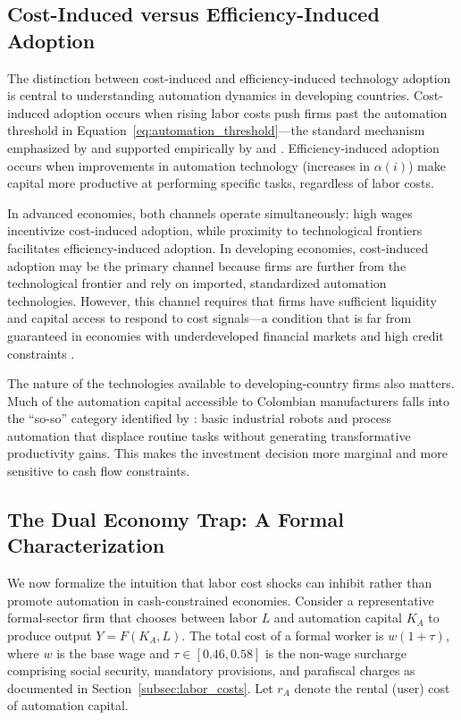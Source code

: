 \documentclass[5p,times,authoryear]{elsarticle}
\begin{document}
\subsection{Cost-Induced versus Efficiency-Induced Adoption}
\label{subsec:cost_vs_efficiency}

The distinction between cost-induced and efficiency-induced technology adoption is central to understanding automation dynamics in developing countries. Cost-induced adoption occurs when rising labor costs push firms past the automation threshold in Equation~\ref{eq:automation_threshold}---the standard mechanism emphasized by \citet{acemoglu2019automation} and supported empirically by \citet{koch2021} and \citet{adachi2022}. Efficiency-induced adoption occurs when improvements in automation technology (increases in $\alpha(i)$) make capital more productive at performing specific tasks, regardless of labor costs.

In advanced economies, both channels operate simultaneously: high wages incentivize cost-induced adoption, while proximity to technological frontiers facilitates efficiency-induced adoption. In developing economies, cost-induced adoption may be the primary channel because firms are further from the technological frontier and rely on imported, standardized automation technologies. However, this channel requires that firms have sufficient liquidity and capital access to respond to cost signals---a condition that is far from guaranteed in economies with underdeveloped financial markets and high credit constraints \citep{busso2020}.

The nature of the technologies available to developing-country firms also matters. Much of the automation capital accessible to Colombian manufacturers falls into the ``so-so'' category identified by \citet{acemoglu2020taxes}: basic industrial robots and process automation that displace routine tasks without generating transformative productivity gains. This makes the investment decision more marginal and more sensitive to cash flow constraints.

\subsection{The Dual Economy Trap: A Formal Characterization}
\label{subsec:formal_trap}

We now formalize the intuition that labor cost shocks can inhibit rather than promote automation in cash-constrained economies. Consider a representative formal-sector firm that chooses between labor $L$ and automation capital $K_A$ to produce output $Y = F(K_A, L)$. The total cost of a formal worker is $w(1 + \tau)$, where $w$ is the base wage and $\tau \in [0.46, 0.58]$ is the non-wage surcharge comprising social security, mandatory provisions, and parafiscal charges as documented in Section~\ref{subsec:labor_costs}. Let $r_A$ denote the rental (user) cost of automation capital.
\end{document}
